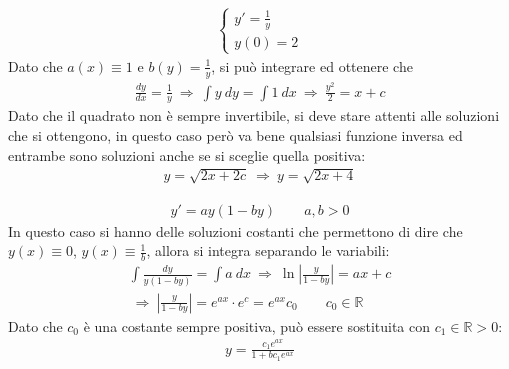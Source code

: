\documentclass[a4paper, oneside]{book}
\begin{document}
\clearpage
\begin{example}
    \begin{gather*}
        \left\{\begin{array}{l}
            y' = \frac{1}{y} \\
            y(0) = 2
        \end{array}\right.
    \end{gather*}
    Dato che $ a(x) \equiv 1$ e $b(y) = \frac{1}{y}$, si può integrare ed ottenere che
    \begin{gather*}
        \frac{dy}{dx} = \frac{1}{y} \ \Longrightarrow \ \int y \ dy = \int 1 \ dx \ \Longrightarrow \ \frac{y^{2} }{2} = x + c
    \end{gather*}
    Dato che il quadrato non è sempre invertibile, si deve stare attenti alle soluzioni che
    si ottengono, in questo caso però va bene qualsiasi funzione inversa ed entrambe sono soluzioni anche se
    si sceglie quella positiva:
    \begin{gather*}
        y = \sqrt{2x + 2c} \ \Longrightarrow \ y = \sqrt{2x + 4} 
    \end{gather*}
\end{example}
\begin{example}
    \begin{gather*}
        y' = ay(1 - by) \qquad a, b > 0
    \end{gather*}
    In questo caso si hanno delle soluzioni costanti che permettono di dire che
    $y(x) \equiv 0$, $y(x) \equiv \frac{1}{b}$, allora si integra separando le variabili:
    \begin{gather*}
        \int \frac{dy}{y(1 - by)} = \int a \ dx \ \Longrightarrow \ \ln\left| \frac{y}{1 - by} \right| = ax + c \\
        \ \Longrightarrow \ \left| \frac{y}{1 - by} \right| = e^{ax} \cdot  e^{c}    = e^{ax}c_0 \qquad c_0 \in \mathbb{R}  
    \end{gather*}
    Dato che $c_0$ è una costante sempre positiva, può essere sostituita con $c_1 \in \mathbb{R} > 0$: 
    \begin{gather*}
        y = \frac{c_1e^{ax}  }{1 + bc_1e^{ax}  }
    \end{gather*}
\end{example}
\end{document}
